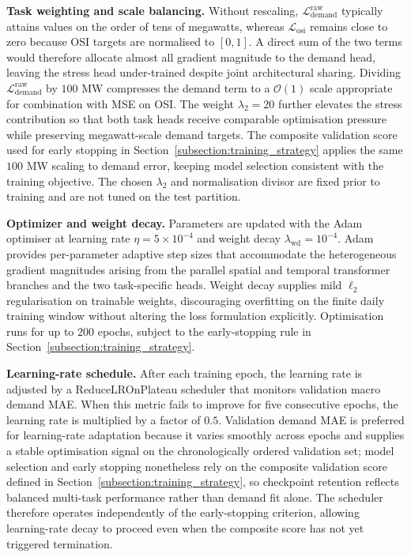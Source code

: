 \textbf{Task weighting and scale balancing.} Without rescaling, \(\mathcal{L}_{\mathrm{demand}}^{\mathrm{raw}}\) typically attains values on the order of tens of megawatts, whereas \(\mathcal{L}_{\mathrm{osi}}\) remains close to zero because OSI targets are normalised to \([0, 1]\). A direct sum of the two terms would therefore allocate almost all gradient magnitude to the demand head, leaving the stress head under-trained despite joint architectural sharing. Dividing \(\mathcal{L}_{\mathrm{demand}}^{\mathrm{raw}}\) by \(100\) MW compresses the demand term to a \(\mathcal{O}(1)\) scale appropriate for combination with MSE on OSI. The weight \(\lambda_2 = 20\) further elevates the stress contribution so that both task heads receive comparable optimisation pressure while preserving megawatt-scale demand targets. The composite validation score used for early stopping in Section~\ref{subsection:training_strategy} applies the same \(100\) MW scaling to demand error, keeping model selection consistent with the training objective. The chosen \(\lambda_2\) and normalisation divisor are fixed prior to training and are not tuned on the test partition.

\textbf{Optimizer and weight decay.} Parameters are updated with the Adam optimiser \cite{Kingma2015Adam} at learning rate \(\eta = 5 \times 10^{-4}\) and weight decay \(\lambda_{\mathrm{wd}} = 10^{-4}\). Adam provides per-parameter adaptive step sizes that accommodate the heterogeneous gradient magnitudes arising from the parallel spatial and temporal transformer branches and the two task-specific heads. Weight decay supplies mild \(\ell_2\) regularisation on trainable weights, discouraging overfitting on the finite daily training window without altering the loss formulation explicitly. Optimisation runs for up to \(200\) epochs, subject to the early-stopping rule in Section~\ref{subsection:training_strategy}.

\textbf{Learning-rate schedule.} After each training epoch, the learning rate is adjusted by a ReduceLROnPlateau scheduler that monitors validation macro demand MAE. When this metric fails to improve for five consecutive epochs, the learning rate is multiplied by a factor of \(0.5\). Validation demand MAE is preferred for learning-rate adaptation because it varies smoothly across epochs and supplies a stable optimisation signal on the chronologically ordered validation set; model selection and early stopping nonetheless rely on the composite validation score defined in Section~\ref{subsection:training_strategy}, so checkpoint retention reflects balanced multi-task performance rather than demand fit alone. The scheduler therefore operates independently of the early-stopping criterion, allowing learning-rate decay to proceed even when the composite score has not yet triggered termination.

